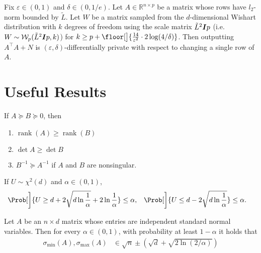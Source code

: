 \documentclass{article}
\newcommand{\inv}[1]{#1^{-1}}
\newcommand{\Real}{\mathds{R}}
\newcommand{\rank}{\operatorname{rank}}
\renewcommand{\det}{\operatorname{det}}
\DeclarePairedDelimiter{\floor}\lfloor\rfloor
\providecommand\transp{\top}
\let\transpsymbol\transp
\renewcommand{\transp}[1]{#1^\transpsymbol}
\newcommand{\Wishart}{\mathcal{W}}
\newcommand{\Eye}[1][]{\bm{I}\notblank{#1}{_{{#1}\times{#1}}}{}}
\newcommand{\XtX}[1]{\transp{#1}{#1}}
\begin{document}
\begin{theorem}%
  \label{thm:wishart-dp}%
  Fix $\varepsilon\in(0,1)$ and $\delta\in(0,1/e)$.  Let
  $A\in\Real^{n\times p}$ be a matrix whose rows have $l_2$-norm
  bounded by $\tilde L$.  Let $W$ be a matrix sampled from the
  $d$-dimensional Wishart distribution with $k$ degrees of freedom
  using the scale matrix $\tilde L^2\Eye{p}$ (i.e.\
  $W \sim \Wishart_p(\tilde L^2\Eye{p}, k)$) for
  $k \ge p + \floor[\big]{\frac{14}{\varepsilon^2}\cdot 2\log(4/\delta)}$.
  Then outputting $\XtX{A} + N$ is
  $(\varepsilon,\delta)$-differentially private with respect to
  changing a single row of $A$.
\end{theorem}

\section{Useful Results}

\begin{claim}%
  \label{claim:psd-matrix-props}%
  If $A \succeq B \succeq 0$, then
  \begin{enumerate}[nolistsep]
  \item $\rank(A) \ge \rank(B)$
  \item $\det A \ge \det B$
  \item $\inv{B} \succeq \inv{A}$ if $A$ and $B$ are nonsingular.
  \end{enumerate}
\end{claim}

\begin{claim}%
  \label{claim:chi2-tails}
  If $U\sim\chi^2(d)$ and $\alpha\in(0,1)$,
  \begin{align*}
    \Prob[\bigg]{U \ge d + 2\sqrt{d\ln\frac{1}{\alpha}} + 2\ln\frac{1}{\alpha}} &\le \alpha,
    & \Prob[\bigg]{U \le d - 2\sqrt{d\ln\frac{1}{\alpha}}} &\le \alpha.
  \end{align*}
\end{claim}

\begin{claim}%
  \label{claim:gaussian-matrix-tails}
  Let $A$ be an $n\times d$ matrix whose entries are independent
  standard normal variables.  Then for every $\alpha\in(0,1)$, with
  probability at least $1-\alpha$ it holds that
  \begin{align*}
    \sigma_{\min}(A), \sigma_{\max}(A) &\in \sqrt{n} \pm (\sqrt{d} + \sqrt{2\ln(2/\alpha)})
  \end{align*}
\end{claim}
\end{document}
